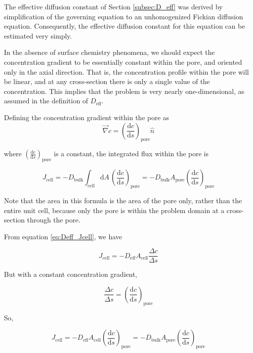 The effective diffusion constant of Section \ref{subsec:D_eff}
was derived by simplification of the governing equation
to an unhomogenized Fickian diffusion equation.
Consequently, the effective diffusion constant for this equation
can be estimated very simply.

In the absence of surface chemistry phenomena,
we should expect the concentration gradient
to be essentially constant within the pore, and oriented only in the axial direction.
That is, the concentration profile within the pore will be linear,
and at any cross-section there is only a single value of the concentration.
This implies that the problem is very nearly one-dimensional,
as assumed in the definition of $D_{\mathrm{eff}}$.

Defining the concentration gradient within the pore as
\begin{equation}
  \vec{\nabla} c = \left(\frac{\mathrm{d}c}{\mathrm{d}s}\right)_{\mathrm{pore}} \hat{n}
\end{equation}

where $\left(\frac{\mathrm{d}c}{\mathrm{d}s}\right)_{\mathrm{pore}}$ is a constant,
the integrated flux within the pore is

\begin{equation}
  J_\mathrm{cell} = -D_\mathrm{bulk} \int_\mathrm{cell} \mathrm{d}A\, \left(\frac{\mathrm{d}c}{\mathrm{d}s}\right)_{\mathrm{pore}}
  = -D_\mathrm{bulk} A_\mathrm{pore} \left(\frac{\mathrm{d}c}{\mathrm{d}s}\right)_{\mathrm{pore}}
\end{equation}

Note that the area in this formula is the area of the pore only,
rather than the entire unit cell, because only the pore is within the problem domain
at a cross-section through the pore.

From equation \ref{eq:Deff_Jcell}, we have

\begin{equation}
  J_{\mathrm{cell}} = - D_{\mathrm{eff}} A_{\mathrm{cell}} \frac{\Delta c}{\Delta s}
\end{equation}

But with a constant concentration gradient,

\begin{equation}
  \frac{\Delta c}{\Delta s} = \left(\frac{\mathrm{d}c}{\mathrm{d}s}\right)_{\mathrm{pore}}
\end{equation}

So,

\begin{equation}
  J_{\mathrm{cell}} = - D_{\mathrm{eff}} A_{\mathrm{cell}} \left(\frac{\mathrm{d}c}{\mathrm{d}s}\right)_{\mathrm{pore}}
  = -D_\mathrm{bulk} A_\mathrm{pore} \left(\frac{\mathrm{d}c}{\mathrm{d}s}\right)_{\mathrm{pore}}
\end{equation}


